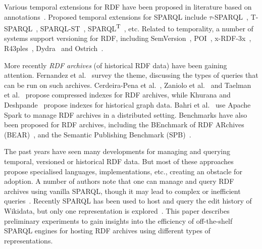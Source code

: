 \documentclass[a4paper]{llncs}
\begin{document}
Various temporal extensions for RDF have been proposed in literature based on annotations~\cite{GutierrezHV07,PuglieseUS08,ZimmermannLPS12}. Proposed temporal extensions for SPARQL include $\tau$-SPARQL~\cite{TappoletB09}, T-SPARQL~\cite{Grandi10}, SPARQL-ST~\cite{PerryJS11}, SPARQL\textsuperscript{T}~\cite{ZanioloGACG18}, etc. Related to temporality, a number of systems support versioning for RDF, including SemVersion~\cite{VolkelG06}, POI~\cite{TzitzikasTA08}, x-RDF-3x~\cite{NeumannW10}, R43ples~\cite{GraubeHU14}, Dydra~\cite{AndersonB16} and Ostrich~\cite{TaelmanSV18}.

More recently \textit{RDF archives} (of historical RDF data) have been gaining attention. Fernandez et al.~\cite{FernandezPU15} survey the theme, discussing the types of queries that can be run on such archives. Cerdeira{-}Pena et al.~\cite{Cerdeira-PenaFF16}, Zaniolo et al.~\cite{ZanioloGACG18} and Taelman et al.~\cite{TaelmanSHMV19} propose compressed indexes for RDF archives, while Khurana and Deshpande~\cite{KhuranaD16} propose indexes for historical graph data. Bahri et al.~\cite{BahriLA18} use Apache Spark to manage RDF archives in a distributed setting. Benchmarks have also been proposed for RDF archives, including the BEnchmark of RDF
ARchives (BEAR)~\cite{FernandezUPK19}, and the Semantic Publishing Benchmark (SPB)~\cite{Papakonstantinou18}.

The past years have seen many developments for managing and querying temporal, versioned or historical RDF data. But most of these approaches propose specialised languages, implementations, etc., creating an obstacle for adoption. A number of authors note that one can manage and query RDF archives using vanilla SPARQL, though it may lead to complex or inefficient queries~\cite{TappoletB09,FernandezUPK19}. Recently SPARQL has been used to host and query the edit history of Wikidata, but only one representation is explored~\cite{TanonS19}. This paper describes preliminary experiments to gain insights into the efficiency of off-the-shelf SPARQL engines for hosting RDF archives using different types of representations.


\end{document}
